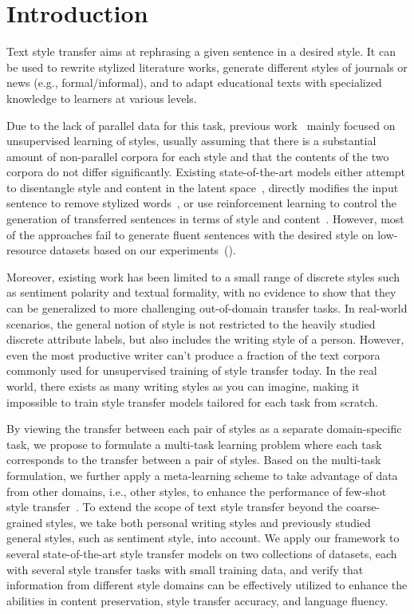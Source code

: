 \section{Introduction}
\label{sec:intro}

Text style transfer aims at rephrasing a given sentence in a desired style. It can be used to rewrite stylized literature works, generate different styles of journals or news (e.g., formal/informal), and to adapt educational texts with 
specialized knowledge to learners at various levels.

Due to the lack of parallel data for this task, previous work~\citep{shen2017style,john2018disentangled,fu2018style} mainly focused on unsupervised learning of styles, usually assuming that there is a substantial amount of non-parallel corpora for each style and that the contents of the two corpora do not differ significantly. Existing state-of-the-art models either attempt to disentangle style and content in the latent space~\citep{shen2017style,john2018disentangled,fu2018style}, directly modifies the input sentence to remove stylized words~\citep{li2018delete}, or use reinforcement learning to control the generation of transferred sentences in terms of style and content~\citep{wu2019hierarchical,luo2019dual}. However, most of the approaches fail to generate fluent sentences with the desired style on low-resource datasets based on our experiments~().


Moreover, existing work has been limited to a small range of discrete styles such as sentiment polarity and textual formality, with no evidence to show that 
they can be generalized to more challenging out-of-domain transfer tasks. In real-world scenarios, the general notion of style is not restricted to the heavily studied discrete attribute labels, but also includes the writing style of a person. However, even the most productive writer can't produce a fraction of the text corpora commonly used for unsupervised training of style transfer today.
In the real world, there exists as many writing styles as you can imagine, making it impossible to train style transfer models tailored for each task from scratch. 

By viewing the transfer between each pair of styles as a separate domain-specific task, we propose to formulate a multi-task learning problem where each task corresponds to the transfer between a pair of styles. Based on the multi-task formulation, we further apply a meta-learning scheme to take advantage of data from other domains, i.e., other styles, to enhance the performance of few-shot style transfer~\citep{finn2017model}. To extend the scope of text style transfer beyond the coarse-grained styles, we take both personal writing styles and previously studied general styles, such as sentiment style, into account. We apply our framework to several state-of-the-art style transfer models on two collections of datasets, each with several style transfer tasks with small training data, and verify that information from different style domains can be effectively utilized to enhance the abilities in content preservation, style transfer accuracy, and language fluency.


